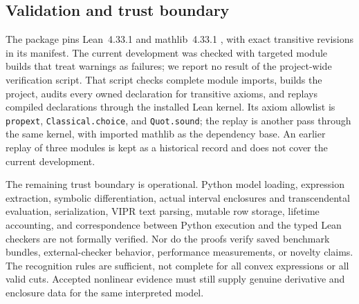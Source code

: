 \subsection{Validation and trust boundary}
The package pins Lean~4.33.1 and mathlib~4.33.1 \citep{mathlib2020}, with exact transitive revisions in its manifest. The current development was checked with targeted module builds that treat warnings as failures; we report no result of the project-wide verification script. That script checks complete module imports, builds the project, audits every owned declaration for transitive axioms, and replays compiled declarations through the installed Lean kernel. Its axiom allowlist is \texttt{propext}, \texttt{Classical.choice}, and \texttt{Quot.sound}; the replay is another pass through the same kernel, with imported mathlib as the dependency base. An earlier replay of three modules is kept as a historical record and does not cover the current development.

The remaining trust boundary is operational. Python model loading, expression extraction, symbolic differentiation, actual interval enclosures and transcendental evaluation, serialization, VIPR text parsing, mutable row storage, lifetime accounting, and correspondence between Python execution and the typed Lean checkers are not formally verified. Nor do the proofs verify saved benchmark bundles, external-checker behavior, performance measurements, or novelty claims. The recognition rules are sufficient, not complete for all convex expressions or all valid cuts. Accepted nonlinear evidence must still supply genuine derivative and enclosure data for the same interpreted model.
